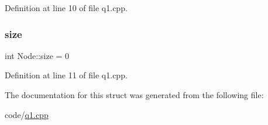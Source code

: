 Definition at line 10 of file q1.\+cpp.

\mbox{\label{struct_node_acc103d220defd2fdb5aac8e3b03424c6}} 
\subsubsection{\texorpdfstring{size}{size}}
{\footnotesize\ttfamily int Node\+::size = 0}



Definition at line 11 of file q1.\+cpp.



The documentation for this struct was generated from the following file\+:\begin{DoxyCompactItemize}
\item 
code/\hyperlink{q1_8cpp}{q1.\+cpp}\end{DoxyCompactItemize}

